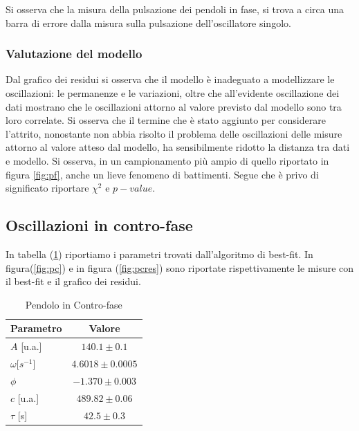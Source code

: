 \documentclass{article}
\begin{document}
            Si osserva che la misura della pulsazione dei pendoli in fase, si trova a circa una barra di errore dalla misura sulla pulsazione dell'oscillatore singolo.
        

            \subsubsection{Valutazione del modello}
          
             Dal grafico dei residui si osserva che il modello è inadeguato a modellizzare le oscillazioni: le permanenze e le variazioni, oltre che all'evidente oscillazione dei dati mostrano che le oscillazioni attorno al valore previsto dal modello sono tra loro correlate.
             Si osserva che il termine che è stato aggiunto per considerare l'attrito, nonostante non abbia risolto il problema delle oscillazioni delle misure attorno al valore atteso dal modello, ha sensibilmente ridotto la distanza tra dati e modello.
             Si osserva, in un campionamento più ampio di quello  riportato in figura \ref{fig:pf}, anche un lieve fenomeno di battimenti.
             Segue che è privo di significato riportare $\chi^2$ e $p-value$.

           

    
		\subsection{  Oscillazioni in contro-fase}
    In tabella (\ref{tab:pc}) riportiamo i parametri trovati dall'algoritmo di best-fit.
              In figura(\ref{fig:pc}) e in figura (\ref{fig:pcres}) sono riportate rispettivamente  le misure con il best-fit e il grafico dei residui. 

                \begin{table}[h!]
                    \centering
                    \caption{Pendolo in Contro-fase}
                    \begin{tabular}{|l|c|}
                            \hline
                            Parametro & Valore \\
                            \hline
                            $A$ [u.a.]& $140.1 \pm 0.1$ \\
                            $\omega$[$s^{-1}$] & $4.6018\pm 0.0005$ \\
                            $\phi$ & $-1.370 \pm 0.003$ \\
                            $c$ [u.a.] & $489.82 \pm 0.06$ \\
                            $\tau$ [s] & $42.5 \pm 0.3$ \\
                            \hline
                            
                    \end{tabular}
                    \label{tab:pc}
                \end{table}
\end{document}
